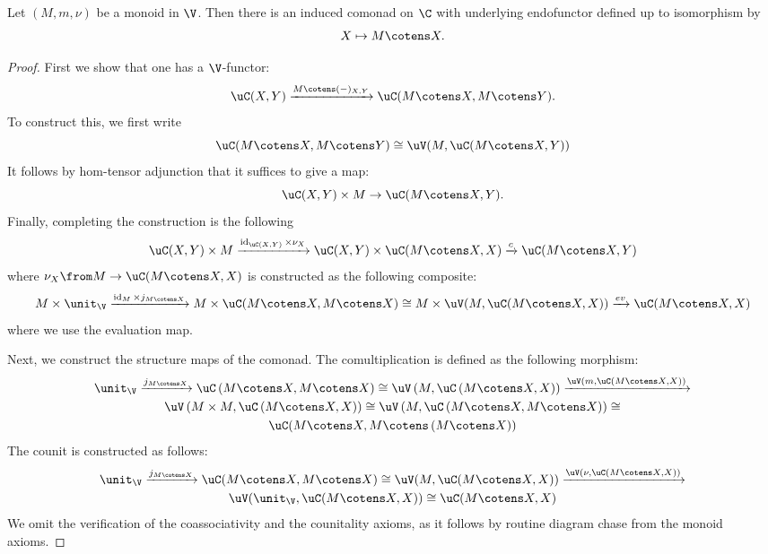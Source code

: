 \documentclass{tac}
\def\id{\operatorname{id}}
\begin{document}
\begin{proposition}
\label{prop: defcoaction}
    Let $(M, m, \nu)$ be a monoid in $\V$. Then there is an induced comonad on $\C$ with underlying endofunctor defined up to isomorphism by
    $$
    X \mapsto M \cotens X.
    $$
\end{proposition}
\begin{proof}
    First we show that one has a $\V$-functor:
    $$
    \uC(X, Y) \xrightarrow{M\cotens(-)_{X, Y}} \uC(M\cotens X, M \cotens Y).
    $$
    To construct this, we first write 
    $$
    \uC(M\cotens X, M \cotens Y)  \cong \uV(M, \uC (M\cotens X,  Y))  
    $$
    It follows by hom-tensor adjunction that it suffices to give a map:
    $$
    \uC(X, Y) \times M \to \uC (M\cotens X,  Y).
    $$
    Finally, completing the construction is the following
    $$
    \uC(X, Y) \times M \xrightarrow{\id_{\uC(X, Y)} \times \nu_X}\uC(X, Y) \times \uC(M\cotens X, X)\xrightarrow{c}\uC (M\cotens X,  Y)
    $$
    where $\nu_X \from M \to \uC(M\cotens X, X)$ is constructed as the following composite:
    $$
    M \times \unit_{\V} \xrightarrow{\id_M\times j_{M \cotens X}} M \times \uC(M \cotens X, M \cotens X) \cong M \times \uV(M, \uC(M \cotens X, X)) \xrightarrow{ev} \uC(M \cotens X, X)
    $$
    where we use the evaluation map.

    Next, we construct the structure maps of the comonad.  The comultiplication is defined as the following morphism:
      \begin{multline*}
    \unit_{\V}   \xrightarrow{j_{M \cotens X}}  \uC\left(M \cotens X, M \cotens X  \right) \cong
    \uV\left(M,  \uC\left(M \cotens X, X  \right) \right) \xrightarrow{\uV\left(m,  \uC\left(M \cotens X, X  \right) \right)} \\\uV\left(M\times M,  \uC\left(M \cotens X, X  \right) \right)  \cong 
    \uV\left(M, \uC\left(M \cotens X, M \cotens X  \right) \right) \cong \\
    \uC(M \cotens X,M \cotens \left( M \cotens X \right)) 
      \end{multline*}
    The counit is constructed as follows:
    \begin{multline*}
        \unit_{\V} \xrightarrow{j_{M\cotens X}} \uC(M\cotens X, M\cotens X) \cong \uV(M, \uC(M \cotens X, X)) \xrightarrow{\uV(\nu, \uC(M \cotens X, X)) } \\
        \uV(\unit_{\V}, \uC(M \cotens X, X)) \cong \uC(M \cotens X, X)
    \end{multline*}
We omit the verification of the coassociativity and the counitality axioms, as it follows by routine diagram chase from the monoid axioms.
\end{proof}
\end{document}
